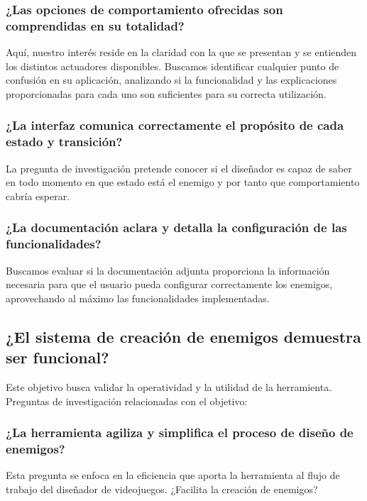 \subsubsection{¿Las opciones de comportamiento ofrecidas son comprendidas en su totalidad?}
Aquí, nuestro interés reside en la claridad con la que se presentan y se entienden los distintos actuadores disponibles. Buscamos identificar cualquier punto de confusión en su aplicación, analizando si la funcionalidad y las explicaciones proporcionadas para cada uno son suficientes para su correcta utilización.\\

\subsubsection{¿La interfaz comunica correctamente el propósito de cada estado y transición?}
La pregunta de investigación pretende conocer si el diseñador es capaz de saber en todo momento en que estado está el enemigo y por tanto que comportamiento cabría esperar.\\

\subsubsection{¿La documentación aclara y detalla la configuración de las funcionalidades?}
Buscamos evaluar si la documentación adjunta proporciona la información necesaria para que el usuario pueda configurar correctamente los enemigos, aprovechando al máximo las funcionalidades implementadas. \\

\subsection{¿El sistema de creación de enemigos demuestra ser funcional?}  \label{sec:funcional}
Este objetivo busca validar la operatividad y la utilidad de la herramienta.\\

Preguntas de investigación relacionadas con el objetivo:
\subsubsection{¿La herramienta agiliza y simplifica el proceso de diseño de enemigos?}
Esta pregunta se enfoca en la eficiencia que aporta la herramienta al flujo de trabajo del diseñador de videojuegos. ¿Facilita la creación de enemigos?\\


